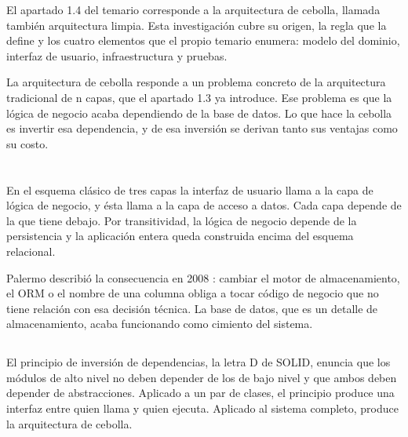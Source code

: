 \documentclass[10pt,a4paper]{article}
\begin{document}
El apartado 1.4 del temario corresponde a la arquitectura de cebolla, llamada también arquitectura limpia. Esta investigación cubre su origen, la regla que la define y los cuatro elementos que el propio temario enumera: modelo del dominio, interfaz de usuario, infraestructura y pruebas.

La arquitectura de cebolla responde a un problema concreto de la arquitectura tradicional de n capas, que el apartado 1.3 ya introduce. Ese problema es que la lógica de negocio acaba dependiendo de la base de datos. Lo que hace la cebolla es invertir esa dependencia, y de esa inversión se derivan tanto sus ventajas como su costo.

\section{\color{colorIPN}{Conceptos previos}}

\subsection{ \color{colorESCOM}{El acoplamiento hacia la base de datos}}

En el esquema clásico de tres capas la interfaz de usuario llama a la capa de lógica de negocio, y ésta llama a la capa de acceso a datos. Cada capa depende de la que tiene debajo. Por transitividad, la lógica de negocio depende de la persistencia y la aplicación entera queda construida encima del esquema relacional.

Palermo describió la consecuencia en 2008 \cite{palermo2008}: cambiar el motor de almacenamiento, el ORM o el nombre de una columna obliga a tocar código de negocio que no tiene relación con esa decisión técnica. La base de datos, que es un detalle de almacenamiento, acaba funcionando como cimiento del sistema.

\subsection{ \color{colorESCOM}{El principio de inversión de dependencias}}

El principio de inversión de dependencias, la letra D de SOLID, enuncia que los módulos de alto nivel no deben depender de los de bajo nivel y que ambos deben depender de abstracciones. Aplicado a un par de clases, el principio produce una interfaz entre quien llama y quien ejecuta. Aplicado al sistema completo, produce la arquitectura de cebolla.
\end{document}
